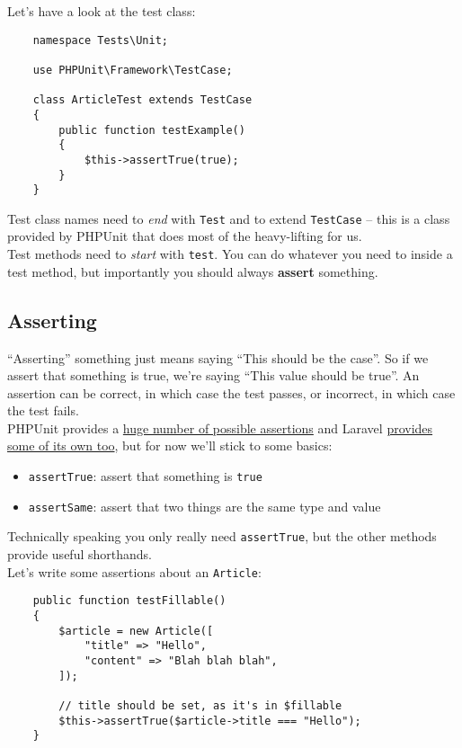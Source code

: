Let's have a look at the test class:

\begin{verbatim}
    namespace Tests\Unit;

    use PHPUnit\Framework\TestCase;

    class ArticleTest extends TestCase
    {
        public function testExample()
        {
            $this->assertTrue(true);
        }
    }
\end{verbatim}

Test class names need to \textit{end} with \texttt{Test} and to extend \texttt{TestCase} – this is a class provided by PHPUnit that does most of the heavy-lifting for us.
\\

Test methods need to \textit{start} with \texttt{test}. You can do whatever you need to inside a test method, but importantly you should always \textbf{assert} something.

\subsection{Asserting}

``Asserting'' something just means saying ``This should be the case''. So if we assert that something is true, we're saying ``This value should be true''. An assertion can be correct, in which case the test passes, or incorrect, in which case the test fails.
\\

PHPUnit provides a \href{https://phpunit.readthedocs.io/en/9.0/assertions.html}{huge number of possible assertions} and Laravel \href{https://laravel.com/docs/master/http-tests#available-assertions}{provides some of its own too}, but for now we'll stick to some basics:

\begin{itemize}
    \item \texttt{assertTrue}: assert that something is \texttt{true}
    \item \texttt{assertSame}: assert that two things are the same type and value
\end{itemize}

Technically speaking you only really need \texttt{assertTrue}, but the other methods provide useful shorthands.
\\

Let's write some assertions about an \texttt{Article}:

\begin{verbatim}
    public function testFillable()
    {
        $article = new Article([
            "title" => "Hello",
            "content" => "Blah blah blah",
        ]);

        // title should be set, as it's in $fillable
        $this->assertTrue($article->title === "Hello");
    }
\end{verbatim}

